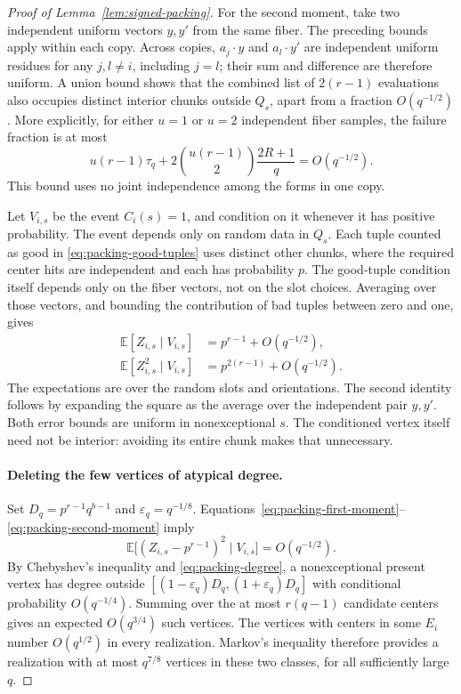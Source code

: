 \begin{proof}[Proof of Lemma~\ref{lem:signed-packing}]
For the second moment, take two independent uniform vectors $y,y'$
from the same fiber.  The preceding bounds apply within each copy.
Across copies, $a_j\cdot y$ and $a_l\cdot y'$ are independent uniform
residues for any $j,l\ne i$, including $j=l$; their sum and difference
are therefore uniform.  A union bound shows that the combined list
of $2(r-1)$ evaluations also occupies distinct interior chunks
outside $Q_s$, apart from a fraction $O(q^{-1/2})$.
More explicitly, for either $u=1$ or $u=2$ independent fiber samples,
the failure fraction is at most
\begin{equation}
 u(r-1)\tau_q+
 2\binom{u(r-1)}2\frac{2R+1}{q}=O(q^{-1/2}).
 \label{eq:packing-good-tuples}
\end{equation}
This bound uses no joint independence among the forms in one copy.

Let $V_{i,s}$ be the event $C_i(s)=1$, and condition on it whenever
it has positive probability.  The event depends only on random data
in $Q_s$.  Each tuple counted as good in
\eqref{eq:packing-good-tuples} uses distinct other chunks, where the
required center hits are independent and each has probability $p$.
The good-tuple condition itself depends only on the fiber vectors,
not on the slot choices.  Averaging over those vectors, and bounding
the contribution of bad tuples between zero and one, gives
\begin{align}
 \mathbb E[Z_{i,s}\mid V_{i,s}]&=p^{r-1}+O(q^{-1/2}),
 \label{eq:packing-first-moment}\\
 \mathbb E[Z_{i,s}^2\mid V_{i,s}]&=p^{2(r-1)}+O(q^{-1/2}).
 \label{eq:packing-second-moment}
\end{align}
The expectations are over the random slots and orientations.
The second identity follows by expanding the square as the average
over the independent pair $y,y'$.  Both error bounds are uniform in
nonexceptional $s$.  The conditioned vertex itself need not be
interior: avoiding its entire chunk makes that unnecessary.

\paragraph{Deleting the few vertices of atypical degree.}
Set $D_q=p^{r-1}q^{b-1}$ and $\varepsilon_q=q^{-1/8}$.
Equations~\eqref{eq:packing-first-moment}--\eqref{eq:packing-second-moment}
imply
\[
 \mathbb E\bigl[(Z_{i,s}-p^{r-1})^2\mid V_{i,s}\bigr]
 =O(q^{-1/2}).
\]
By Chebyshev's inequality and \eqref{eq:packing-degree}, a
nonexceptional present vertex has degree outside
$[(1-\varepsilon_q)D_q,(1+\varepsilon_q)D_q]$ with conditional
probability $O(q^{-1/4})$.  Summing over the at most $r(q-1)$ candidate
centers gives an expected $O(q^{3/4})$ such vertices.  The vertices with
centers in some $E_i$ number $O(q^{1/2})$ in every realization.
Markov's inequality therefore provides a realization with at most
$q^{7/8}$ vertices in these two classes, for all sufficiently large $q$.


\end{proof}
